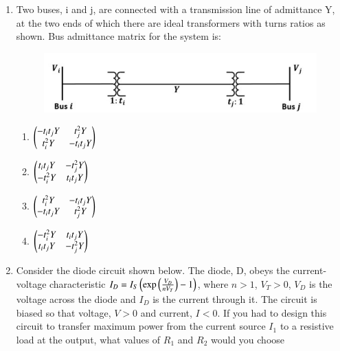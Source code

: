 \documentclass[journal,12pt,onecolumn]{IEEEtran}
\theoremstyle{remark}
\begin{document}
\begin{enumerate}[start=1, label=Q.\arabic*]
    \hfill{}
\item Two buses, i and j, are connected with a transmission line of admittance Y, at the two ends of which there are ideal transformers with turns ratios as shown. Bus admittance matrix for the system is:
    \begin{figure}[H]
        \centering
        \includegraphics[width=0.6\columnwidth]{Figures/39.png}
        \caption{}
    \end{figure}
    \begin{enumerate}
        \item $\begin{pmatrix}-t_{i}t_{j}Y & t_{j}^{2}Y \\ t_{i}^{2}Y & -t_{i}t_{j}Y\end{pmatrix}$
        \item $\begin{pmatrix}t_{i}t_{j}Y & -t_{j}^{2}Y \\ -t_{i}^{2}Y & t_{i}t_{j}Y\end{pmatrix}$
        \item $\begin{pmatrix}t_{i}^{2}Y & -t_{i}t_{j}Y \\ -t_{i}t_{j}Y & t_{j}^{2}Y\end{pmatrix}$
        \item $\begin{pmatrix}-t_{i}^{2}Y & t_{i}t_{j}Y \\ t_{i}t_{j}Y & -t_{j}^{2}Y\end{pmatrix}$
    \end{enumerate}

    \hfill{}

    \item Consider the diode circuit shown below. The diode, D, obeys the current-voltage characteristic $I_D = I_S \left(\exp\left(\frac{V_D}{nV_T}\right) - 1\right)$, where $n>1$, $V_T>0$, $V_D$ is the voltage across the diode and $I_D$ is the current through it. The circuit is biased so that voltage, $V>0$ and current, $I<0$. If you had to design this circuit to transfer maximum power from the current source $I_1$ to a resistive load  at the output, what values of $R_1$ and $R_2$ would you choose

\begin{enumerate}
\end{enumerate}


\end{enumerate}
\end{document}
